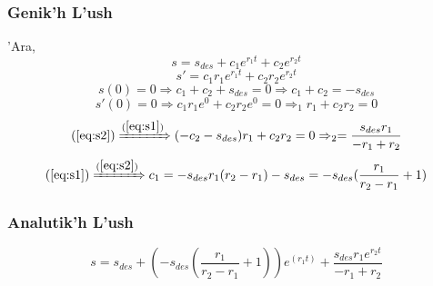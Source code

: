 \documentclass[a4paper]{article}
\begin{document}
        \subsubsection{Genik'h L'ush}
        'Ara,
        \[s=s_{des}+c_1e^{r_1t}+c_2e^{r_2t}\]
        \[s'=c_1r_1e^{r_1t}+c_2r_2e^{r_2t}\]
        \begin{equation}
        s(0)=0\Rightarrow c_1+c_2+s_{des}=0\Rightarrow c_1+c_2=-s_{des}
        \label{eq:s1}
        \end{equation}
        \begin{equation}
            s'(0)=0\Rightarrow c_1r_1e^0+c_2r_2e^0=0\Rightarrow_1r_1+c_2r_2=0
            \label{eq:s2}
        \end{equation}
        \[(\ref{eq:s2})\xRightarrow{(\ref{eq:s1})}(-c_2-s_{des})r_1+c_2r_2=0\Rightarrow_2=\frac{s_{des}r_1}{-r_1+r_2}\]
        \[(\ref{eq:s1})\xRightarrow{(\ref{eq:s2})}c_1=-s_{des}r_1(r_2-r_1)-s_{des}=-s_{des}(\frac{r_1}{r_2-r_1}+1)\]
        \subsubsection{Analutik'h L'ush}
        \[s=s_{des}+(-s_{des}(\frac{r_1}{r_2-r_1}+1))e^(r_1t)+\frac{s_{des}r_1e^{r_2t}}{-r_1+r_2}\]
        \[\]
\end{document}
